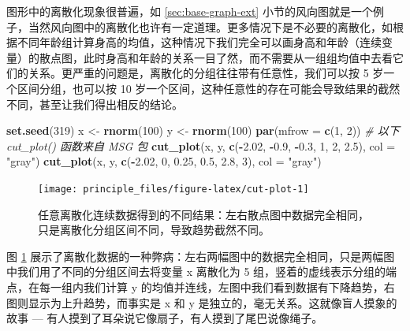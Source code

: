 \documentclass[
  b5paper,
  UTF8,twoside]{book}
\newenvironment{Shaded}{\begin{snugshade}}{\end{snugshade}}
\newcommand{\AttributeTok}[1]{\textcolor[rgb]{0.13,0.29,0.53}{#1}}
\newcommand{\CommentTok}[1]{\textcolor[rgb]{0.56,0.35,0.01}{\textit{#1}}}
\newcommand{\DecValTok}[1]{\textcolor[rgb]{0.00,0.00,0.81}{#1}}
\newcommand{\FloatTok}[1]{\textcolor[rgb]{0.00,0.00,0.81}{#1}}
\newcommand{\FunctionTok}[1]{\textcolor[rgb]{0.13,0.29,0.53}{\textbf{#1}}}
\newcommand{\NormalTok}[1]{#1}
\newcommand{\OtherTok}[1]{\textcolor[rgb]{0.56,0.35,0.01}{#1}}
\newcommand{\SpecialCharTok}[1]{\textcolor[rgb]{0.81,0.36,0.00}{\textbf{#1}}}
\newcommand{\StringTok}[1]{\textcolor[rgb]{0.31,0.60,0.02}{#1}}
\begin{document}
图形中的离散化现象很普遍，如 \ref{sec:base-graph-ext} 小节的风向图就是一个例子，当然风向图中的离散化也许有一定道理。更多情况下是不必要的离散化，如根据不同年龄组计算身高的均值，这种情况下我们完全可以画身高和年龄（连续变量）的散点图，此时身高和年龄的关系一目了然，而不需要从一组组均值中去看它们的关系。更严重的问题是，离散化的分组往往带有任意性，我们可以按 5 岁一个区间分组，也可以按 10 岁一个区间，这种任意性的存在可能会导致结果的截然不同，甚至让我们得出相反的结论。

\begin{Shaded}
\begin{Highlighting}[]
\FunctionTok{set.seed}\NormalTok{(}\DecValTok{319}\NormalTok{)}
\NormalTok{x }\OtherTok{\textless{}{-}} \FunctionTok{rnorm}\NormalTok{(}\DecValTok{100}\NormalTok{)}
\NormalTok{y }\OtherTok{\textless{}{-}} \FunctionTok{rnorm}\NormalTok{(}\DecValTok{100}\NormalTok{)}
\FunctionTok{par}\NormalTok{(}\AttributeTok{mfrow =} \FunctionTok{c}\NormalTok{(}\DecValTok{1}\NormalTok{, }\DecValTok{2}\NormalTok{)) }\CommentTok{\# 以下 cut\_plot() 函数来自 MSG 包}
\FunctionTok{cut\_plot}\NormalTok{(x, y, }\FunctionTok{c}\NormalTok{(}\SpecialCharTok{{-}}\FloatTok{2.02}\NormalTok{, }\SpecialCharTok{{-}}\FloatTok{0.9}\NormalTok{, }\SpecialCharTok{{-}}\FloatTok{0.3}\NormalTok{, }\DecValTok{1}\NormalTok{, }\DecValTok{2}\NormalTok{, }\FloatTok{2.5}\NormalTok{), }\AttributeTok{col =} \StringTok{"gray"}\NormalTok{)}
\FunctionTok{cut\_plot}\NormalTok{(x, y, }\FunctionTok{c}\NormalTok{(}\SpecialCharTok{{-}}\FloatTok{2.02}\NormalTok{, }\DecValTok{0}\NormalTok{, }\FloatTok{0.25}\NormalTok{, }\FloatTok{0.5}\NormalTok{, }\FloatTok{2.8}\NormalTok{, }\DecValTok{3}\NormalTok{), }\AttributeTok{col =} \StringTok{"gray"}\NormalTok{)}
\end{Highlighting}
\end{Shaded}

\begin{figure}

{\centering \texttt{[image: principle\_files/figure-latex/cut-plot-1]} 

}

\caption[ 任意离散化连续数据得到的不同结果 ]{任意离散化连续数据得到的不同结果：左右散点图中数据完全相同，只是离散化分组区间不同，导致趋势截然不同。}\label{fig:cut-plot}
\end{figure}



图 \ref{fig:cut-plot} 展示了离散化数据的一种弊病：左右两幅图中的数据完全相同，只是两幅图中我们用了不同的分组区间去将变量 x 离散化为 5 组，竖着的虚线表示分组的端点，在每一组内我们计算 y 的均值并连线，左图中我们看到数据有下降趋势，右图则显示为上升趋势，而事实是 x 和 y 是独立的，毫无关系。这就像盲人摸象的故事 --- 有人摸到了耳朵说它像扇子，有人摸到了尾巴说像绳子。
\end{document}
